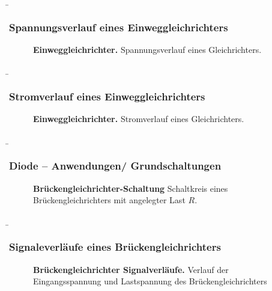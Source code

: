 \begin{frame}
    \b{ \frametitle{Spannungsverlauf eines Einweggleichrichters}
        \begin{figure}[H]

            \centering
                 

            \caption{\textbf{Einweggleichrichter.} Spannungsverlauf eines Gleichrichters. }
        \end{figure}
    }   

\end{frame}

\begin{frame}
    \b{ \frametitle{ Stromverlauf eines Einweggleichrichters}
    
    \begin{figure}
        \centering
        
        \caption{\textbf{Einweggleichrichter.} Stromverlauf eines Gleichrichters. }  
    \end{figure}
    }
\end{frame}


\begin{frame}
    \b{ \frametitle{Diode -- Anwendungen/ Grundschaltungen}
        \begin{figure}[H]
            \centering
            
            \label{fig:BrueckengleichrichterSchaltungFolie}
            \caption{\textbf{Brückengleichrichter-Schaltung} Schaltkreis eines Brückengleichrichters mit angelegter Last $R$.} 
        \end{figure}
    }   
\end{frame}

\begin{frame}
    \b{ \frametitle{Signaleverläufe eines Brückengleichrichters}
        \begin{figure}[H]
            \centering
            
            \caption{\textbf{Brückengleichrichter Signalverläufe.} Verlauf der Eingangsspannung und Lastspannung des 
            Brückengleichrichters }  
            \label{fig:BrueckengleichrichterSignalverlaeufeFolie}
        \end{figure}
    }
\end{frame}

